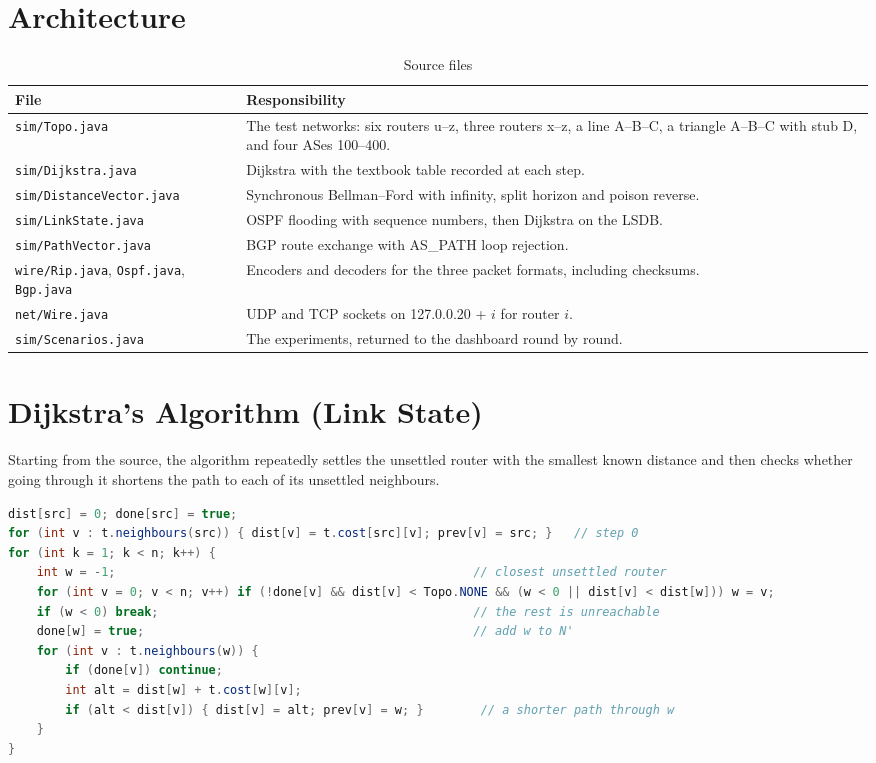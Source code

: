 \documentclass[11pt,a4paper]{article}
\begin{document}
\section{Architecture}
\begin{table}[H]
\centering
\caption{Source files}
\small
\begin{tabularx}{\textwidth}{@{}lY@{}}
\toprule
\textbf{File} & \textbf{Responsibility} \\ \midrule
\texttt{sim/Topo.java} & The test networks: six routers u--z, three routers x--z, a line A--B--C, a triangle A--B--C with stub D, and four ASes 100--400. \\
\texttt{sim/Dijkstra.java} & Dijkstra with the textbook table recorded at each step. \\
\texttt{sim/DistanceVector.java} & Synchronous Bellman--Ford with infinity, split horizon and poison reverse. \\
\texttt{sim/LinkState.java} & OSPF flooding with sequence numbers, then Dijkstra on the LSDB. \\
\texttt{sim/PathVector.java} & BGP route exchange with AS\_PATH loop rejection. \\
\texttt{wire/Rip.java}, \texttt{Ospf.java}, \texttt{Bgp.java} & Encoders and decoders for the three packet formats, including checksums. \\
\texttt{net/Wire.java} & UDP and TCP sockets on 127.0.0.20 + $i$ for router $i$. \\
\texttt{sim/Scenarios.java} & The experiments, returned to the dashboard round by round. \\ \bottomrule
\end{tabularx}
\end{table}

\section{Dijkstra's Algorithm (Link State)}
Starting from the source, the algorithm repeatedly settles the unsettled router with the smallest known distance and then checks whether going through it shortens the path to each of its unsettled neighbours.

\begin{lstlisting}[language=Java, caption={The main loop of \texttt{sim/Dijkstra.java}.}]
dist[src] = 0; done[src] = true;
for (int v : t.neighbours(src)) { dist[v] = t.cost[src][v]; prev[v] = src; }   // step 0
for (int k = 1; k < n; k++) {
    int w = -1;                                                  // closest unsettled router
    for (int v = 0; v < n; v++) if (!done[v] && dist[v] < Topo.NONE && (w < 0 || dist[v] < dist[w])) w = v;
    if (w < 0) break;                                            // the rest is unreachable
    done[w] = true;                                              // add w to N'
    for (int v : t.neighbours(w)) {
        if (done[v]) continue;
        int alt = dist[w] + t.cost[w][v];
        if (alt < dist[v]) { dist[v] = alt; prev[v] = w; }        // a shorter path through w
    }
}
\end{lstlisting}
\end{document}
